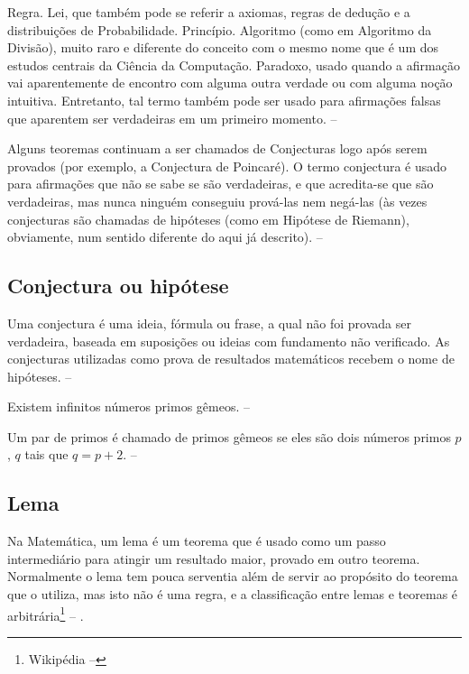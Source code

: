 Regra.
Lei, que também pode se referir a axiomas, regras de dedução e a distribuições
de Probabilidade.
Princípio.
Algoritmo (como em Algoritmo da Divisão), muito raro e diferente do conceito
com o mesmo nome que é um dos estudos centrais da Ciência da Computação.
Paradoxo, usado quando a afirmação vai aparentemente de encontro com alguma
outra verdade ou com alguma noção intuitiva. Entretanto, tal termo também pode
ser usado para afirmações falsas que aparentem ser verdadeiras em um primeiro
momento. -- \showfont

Alguns teoremas continuam a ser chamados de Conjecturas logo após serem
provados (por exemplo, a Conjectura de Poincaré). O termo conjectura é usado
para afirmações que não se sabe se são verdadeiras, e que acredita-se que são
verdadeiras, mas nunca ninguém conseguiu prová-las nem negá-las (às vezes
conjecturas são chamadas de hipóteses (como em Hipótese de Riemann),
obviamente, num sentido diferente do aqui já descrito). -- \showfont

\subsection{Conjectura ou hipótese}

Uma conjectura é uma ideia, fórmula ou frase, a qual não foi provada ser
verdadeira, baseada em suposições ou ideias com fundamento não verificado. As
conjecturas utilizadas como prova de resultados matemáticos recebem o nome de
hipóteses. -- \showfont

\begin{conjectura}
Existem infinitos números primos gêmeos. -- \showfont
\end{conjectura}

Um par de primos é chamado de primos gêmeos se eles são dois números primos
$p$, $q$ tais que $q = p + 2$. -- \showfont

\subsection{Lema}

    Na Matemática, um lema é um teorema que é usado como um passo intermediário
    para atingir um resultado maior, provado em outro teorema. Normalmente o
    lema tem pouca serventia além de servir ao propósito do teorema que o
    utiliza, mas isto não é uma regra, e a classificação entre lemas e teoremas
    é arbitrária\footnote{Wikipédia -- \showfont} -- \showfont.

